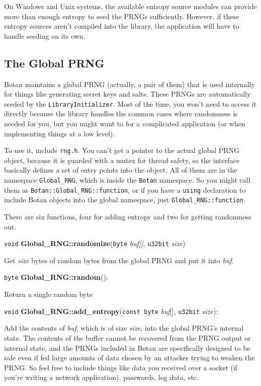\documentclass{article}
\newcommand{\filename}[1]{\texttt{#1}}
\newcommand{\function}[1]{\textbf{#1}}
\newcommand{\keyword}[1]{\texttt{#1}}
\newcommand{\type}[1]{\texttt{#1}}
\renewcommand{\arg}[1]{\textsl{#1}}
\newcommand{\namespace}[1]{\texttt{#1}}
\begin{document}
On Windows and Unix systems, the available entropy source modules can provide
more than enough entropy to seed the PRNGs sufficiently. However, if these
entropy sources aren't compiled into the library, the application will have to
handle seeding on its own.

\pagebreak

\subsection{The Global PRNG}

Botan maintains a global PRNG (actually, a pair of them) that is used
internally for things like generating secret keys and salts. These PRNGs are
automatically seeded by the \type{LibraryInitializer}. Most of the time, you
won't need to access it directly because the library handles the common cases
where randomness is needed for you, but you might want to for a complicated
application (or when implementing things at a low level).

To use it, include \filename{rng.h}. You can't get a pointer to the actual
global PRNG object, because it is guarded with a mutex for thread safety, so
the interface basically defines a set of entry points into the object. All of
them are in the namespace \namespace{Global\_RNG}, which is inside the
\namespace{Botan} namespace. So you might call them as
\texttt{Botan::Global\_RNG::function}, or if you have a \keyword{using}
declaration to include Botan objects into the global namespace, just
\texttt{Global\_RNG::function}.

There are six functions, four for adding entropy and two for getting
randomness out.

\vskip 5pt
\noindent
\type{void} \function{Global\_RNG::randomize}(\type{byte} \arg{buf[]},
                                              \type{u32bit} \arg{size})

Get \arg{size} bytes of random bytes from the global PRNG and put it into
\arg{buf}.

\vskip 5pt
\noindent
\type{byte} \function{Global\_RNG::random}():

Return a single random byte

\vskip 5pt
\noindent
\type{void} \function{Global\_RNG::add\_entropy}(\type{const byte} \arg{buf}[],
                                                 \type{u32bit} \arg{size}):

Add the contents of \arg{buf}, which is of size \arg{size}, into the global
PRNG's internal state. The contents of the buffer cannot be recovered from the
PRNG output or internal state, and the PRNGs included in Botan are specifically
designed to be safe even if fed large amounts of data chosen by an attacker
trying to weaken the PRNG. So feel free to include things like data you
received over a socket (if you're writing a network application), passwords,
log data, etc.
\end{document}
